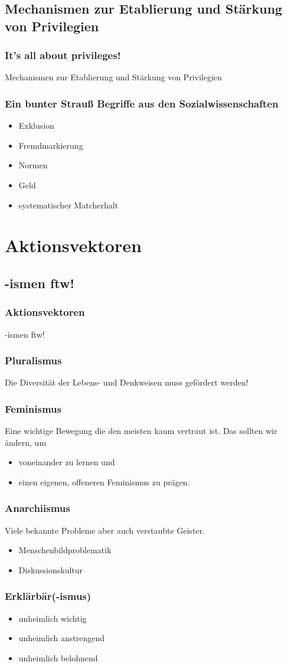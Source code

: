\documentclass{beamer}
\begin{document}
\subsection{Mechanismen zur Etablierung und Stärkung von Privilegien}

\frame
{
  \frametitle{It's all about privileges!}
  Mechanismen zur Etablierung und Stärkung von Privilegien
}
\frame
{
  \frametitle{Ein bunter Strauß Begriffe aus den Sozialwissenschaften}
  
  \begin{itemize}[<+->]
  \item Exklusion
  \item Fremdmarkierung
  \item Normen
  \item Geld
  \item systematischer Matcherhalt
  \end{itemize}
}
\section{Aktionsvektoren}
\subsection{-ismen ftw!}

\frame
{
  \frametitle{Aktionsvektoren}
  -ismen ftw!
}
\frame
{
  \frametitle{Pluralismus}
  
  Die Diversität der Lebens- und Denkweisen muss gefördert werden!
}
\frame
{
  \frametitle{Feminismus}
  
  Eine wichtige Bewegung die den meisten kaum vertraut ist. Das sollten wir ändern, um
  \begin{itemize}[<+->]
  \item voneinander zu lernen und
  \item einen eigenen, offeneren Feminismus zu prägen.
  \end{itemize}

}
\frame
{
  \frametitle{Anarchiismus}
  
  Viele bekannte Probleme aber auch verstaubte Geister.
  \begin{itemize}[<+->]
  \item Menschenbildproblematik
  \item Diskussionskultur
  \end{itemize}

}
\frame
{
  \frametitle{Erklärbär(-ismus)}
  
  \begin{itemize}[<+->]
  \item unheimlich wichtig
  \item unheimlich anstrengend
  \item unheimlich belohnend
  \end{itemize}
  
}
\end{document}
